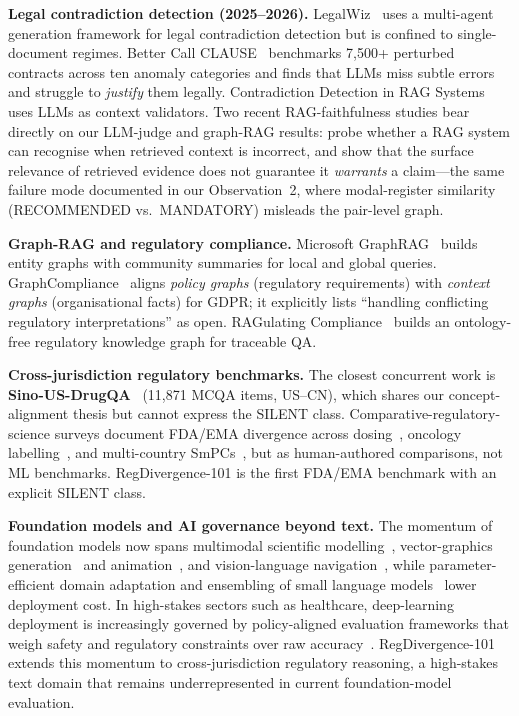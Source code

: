 \documentclass[manuscript]{acmart}
\begin{document}
\textbf{Legal contradiction detection (2025--2026).}
LegalWiz~\cite{legalwiz2025} uses a multi-agent generation framework for legal
contradiction detection but is confined to single-document regimes. Better Call
CLAUSE~\cite{betterclause2026} benchmarks 7,500+
perturbed contracts across ten anomaly categories and finds that LLMs miss
subtle errors and struggle to \textit{justify} them legally. Contradiction
Detection in RAG Systems~\cite{contradictionrag2025} uses LLMs as context
validators. Two recent RAG-faithfulness studies bear directly on our LLM-judge
and graph-RAG results: \citet{chen2026ragwrong} probe whether a RAG system can
recognise when retrieved context is incorrect, and \citet{qian2026evidenceforce}
show that the surface relevance of retrieved evidence does not guarantee it
\textit{warrants} a claim---the same failure mode documented in our Observation~2, where
modal-register similarity (RECOMMENDED vs.\ MANDATORY) misleads the pair-level
graph.

\textbf{Graph-RAG and regulatory compliance.}
Microsoft GraphRAG~\cite{edge2024graphrag} builds entity graphs with community
summaries for local and global queries. GraphCompliance~\cite{graphcompliance2025}
aligns \textit{policy graphs} (regulatory requirements) with \textit{context
graphs} (organisational facts) for GDPR; it explicitly lists ``handling
conflicting regulatory interpretations'' as open. RAGulating
Compliance~\cite{ragulating2025} builds an ontology-free regulatory knowledge
graph for traceable QA.

\textbf{Cross-jurisdiction regulatory benchmarks.}
The closest concurrent work is \textbf{Sino-US-DrugQA}~\cite{sinousdrugqa2026}
(11{,}871 MCQA items, US--CN), which shares our concept-alignment thesis but
cannot express the SILENT class. Comparative-regulatory-science surveys document
FDA/EMA divergence across dosing~\cite{mita2026doses}, oncology
labelling~\cite{gomezfernandez2026inhibitors}, and multi-country
SmPCs~\cite{pvverse2026}, but as human-authored comparisons, not ML benchmarks.
RegDivergence-101 is the first FDA/EMA benchmark with an explicit SILENT class.

\textbf{Foundation models and AI governance beyond text.} The momentum of
foundation models now spans multimodal scientific modelling~\cite{11541222},
vector-graphics generation~\cite{liang2026render} and animation~\cite{liang2026vanim},
and vision-language navigation~\cite{zeng2025janusvln}, while parameter-efficient
domain adaptation and ensembling of small language models~\cite{codes2026} lower
deployment cost. In high-stakes sectors such as healthcare, deep-learning
deployment is increasingly governed by policy-aligned evaluation frameworks that
weigh safety and regulatory constraints over raw accuracy~\cite{chen2026dlsg}.
RegDivergence-101 extends this momentum to cross-jurisdiction regulatory
reasoning, a high-stakes text domain that remains underrepresented in current
foundation-model evaluation.
\end{document}
